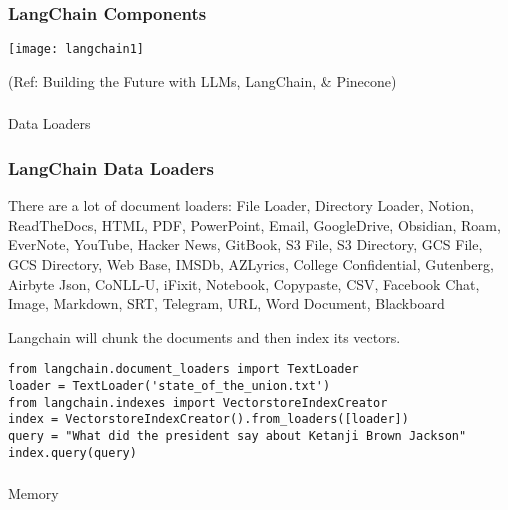 \begin{frame}[fragile]\frametitle{LangChain Components}

\begin{center}
\texttt{[image: langchain1]}
\end{center}	  

{\tiny (Ref: Building the Future with LLMs, LangChain, \& Pinecone)}
\end{frame}

\begin{frame}[fragile]\frametitle{}
\begin{center}
{\Large Data Loaders}
\end{center}
\end{frame}

\begin{frame}[fragile]\frametitle{LangChain Data Loaders}

There are a lot of document loaders: File Loader, Directory Loader, Notion, ReadTheDocs, HTML, PDF, PowerPoint, Email, GoogleDrive, Obsidian, Roam, EverNote, YouTube, Hacker News, GitBook, S3 File, S3 Directory, GCS File, GCS Directory, Web Base, IMSDb, AZLyrics, College Confidential, Gutenberg, Airbyte Json, CoNLL-U, iFixit, Notebook, Copypaste, CSV, Facebook Chat, Image, Markdown, SRT, Telegram, URL, Word Document, Blackboard

Langchain will chunk the documents and then index its vectors.

\begin{lstlisting}
from langchain.document_loaders import TextLoader
loader = TextLoader('state_of_the_union.txt')
from langchain.indexes import VectorstoreIndexCreator
index = VectorstoreIndexCreator().from_loaders([loader])
query = "What did the president say about Ketanji Brown Jackson"
index.query(query)
\end{lstlisting}	  

\end{frame}


\begin{frame}[fragile]\frametitle{}
\begin{center}
{\Large Memory}
\end{center}
\end{frame}


